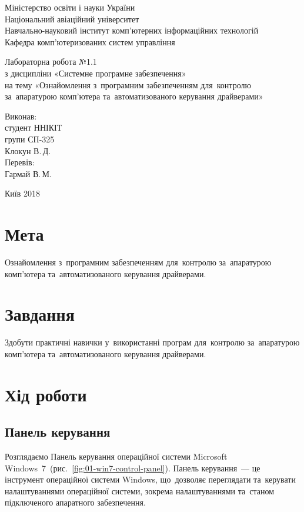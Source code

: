 \documentclass[
	a4paper,
	oneside,
	DIV = 12,
	12pt,
	headings = normal,
]{scrartcl}
\begin{document}
	\begin{titlepage}
		\begin{center}
			Міністерство освіти і науки України\\
			Національний авіаційний університет\\
			Навчально-науковий інститут комп'ютерних інформаційних технологій\\
			Кафедра комп'ютеризованих систем управління

			\vspace{\fill}
				Лабораторна робота №1.1\\
				з дисципліни «Системне програмне забезпечення»\\
				на тему «Ознайомлення з~програмним забезпеченням для~контролю за~апаратурою комп'ютера та~автоматизованого керування драйверами»\\

			\vspace{\fill}

			\begin{flushright}
				Виконав:\\
				студент ННІКІТ\\
				групи СП-325\\
				Клокун В.\,Д.\\
				Перевів:\\
				Гармай В.\,М.
			\end{flushright}

			Київ 2018
		\end{center}
	\end{titlepage}

	\section{Мета}
		Ознайомлення з~програмним забезпеченням для~контролю за~апаратурою ком\-п'\-ю\-те\-ра та~автоматизованого керування драйверами.

	\section{Завдання}
		Здобути практичні навички у~використанні програм для~контролю за~апаратурою ком\-п'\-ю\-те\-ра та~автоматизованого керування драйверами.
		
	\section{Хід роботи}
		\subsection{Панель керування}
			Розглядаємо Панель керування операційної системи Microsoft Windows~7~(рис.~\ref{fig:01-win7-control-panel}). Панель керування~— це інструмент операційної системи Windows, що~дозволяє переглядати та~керувати налаштуваннями операційної системи, зокрема налаштуваннями та~станом підключеного апаратного забезпечення.
\end{document}
